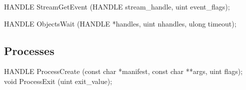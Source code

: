 \begin{paldef}
HANDLE StreamGetEvent (HANDLE stream_handle, uint event_flags);
\end{paldef}


\begin{paldef}
HANDLE ObjectsWait (HANDLE *handles, uint nhandles,
                    ulong timeout);
\end{paldef}




\subsection{Processes}
\label{sec:abi:proc}



\begin{paldef}
HANDLE ProcessCreate (const char *manifest,
                      const char **args, uint flags);
void ProcessExit (uint exit_value);
\end{paldef}